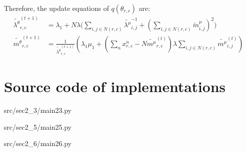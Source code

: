 \documentclass[12pt]{article}
\newenvironment{problem}[2][Problem]{\begin{trivlist}
\item[\hskip \labelsep {\bfseries #1}\hskip \labelsep {\bfseries #2.}]}{\end{trivlist}}
\begin{document}
\begin{problem}{2.9.25}
Therefore, the update equations of $q(\theta_{r,c})$ are:
\begin{align*}
    \tilde{\lambda^{\theta}}_{r,c}^{(t+1)}
    &= \lambda_1 + N\lambda\biggl(
        \sum_{i,j \in N(r,c)}\tilde{\lambda^{\mu}}^{-1}_{i,j} + (\sum_{i,j \in N(r,c)}\tilde{m}^{\mu}_{i,j})^2 
        \biggl)\\
    \tilde{m^{\theta}}_{r,c}^{(t+1)}
    &= \frac{1}{\tilde{\lambda^{\theta}}_{r,c}^{(t+1)}}
    (\lambda_1\mu_1 + (\sum_n x^n_{r,c} - N\tilde{m^{\mu}}_{r,c}^{(t)})\lambda\sum_{i,j \in N(r,c)}\tilde{m^{\mu}}_{i,j}^{(t)})
\end{align*}
\end{problem} %



\pagebreak
\appendix
\section{Source code of implementations}

                 {src/sec2_3/main23.py}

                 {src/sec2_5/main25.py}

                 {src/sec2_6/main26.py}
\pagebreak

\end{document}
